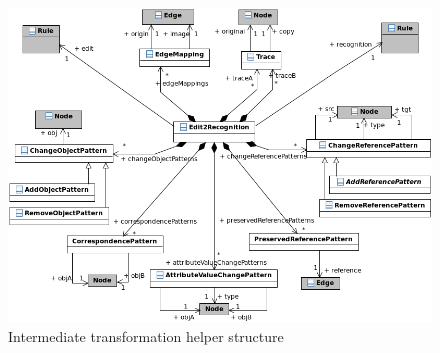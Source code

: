 \documentclass{llncs}
\begin{document}
\begin{figure}[htbp]
  \centering
  \includegraphics[width=\textwidth]{pic/helper-structure-1.png}
  \caption{Intermediate transformation helper structure}
  \label{fig:helper-structure}
\end{figure}


% 
\end{document}
